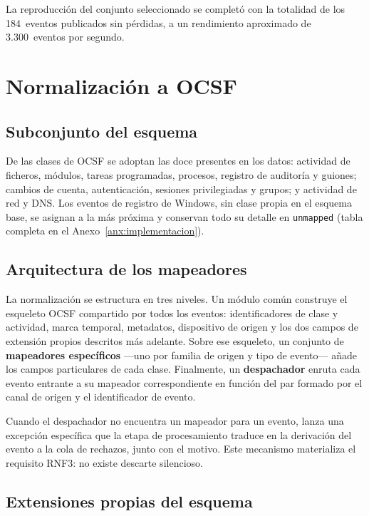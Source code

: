 La reproducción del conjunto seleccionado se completó con la totalidad de los 184~eventos
publicados sin pérdidas, a un rendimiento aproximado de 3.300~eventos por segundo.

\section{Normalización a OCSF}

\subsection{Subconjunto del esquema}

De las clases de OCSF se adoptan las doce presentes en los datos: actividad de ficheros,
módulos, tareas programadas, procesos, registro de auditoría y guiones; cambios de cuenta,
autenticación, sesiones privilegiadas y grupos; y actividad de red y DNS. Los eventos de
registro de Windows, sin clase propia en el esquema base, se asignan a la más próxima y
conservan todo su detalle en \texttt{unmapped} (tabla completa en el Anexo~\ref{anx:implementacion}).

\subsection{Arquitectura de los mapeadores}

La normalización se estructura en tres niveles. Un módulo común construye el esqueleto OCSF
compartido por todos los eventos: identificadores de clase y actividad, marca temporal,
metadatos, dispositivo de origen y los dos campos de extensión propios descritos más
adelante. Sobre ese esqueleto, un conjunto de \textbf{mapeadores específicos} —uno por
familia de origen y tipo de evento— añade los campos particulares de cada clase. Finalmente,
un \textbf{despachador} enruta cada evento entrante a su mapeador correspondiente en función
del par formado por el canal de origen y el identificador de evento.

Cuando el despachador no encuentra un mapeador para un evento, lanza una excepción específica
que la etapa de procesamiento traduce en la derivación del evento a la cola de rechazos,
junto con el motivo. Este mecanismo materializa el requisito RNF3: no existe descarte
silencioso.

\subsection{Extensiones propias del esquema}

